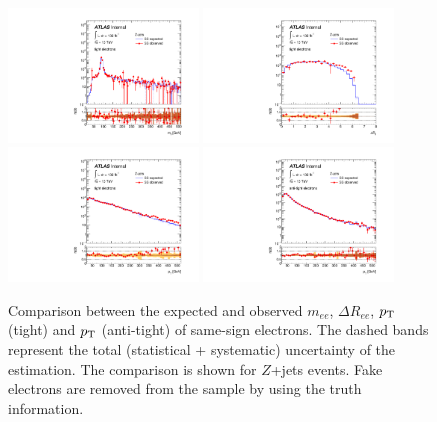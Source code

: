 \begin{figure}[htb!]
\centering
  \includegraphics[width=0.45\textwidth]{figures/qmisid/valid_MlltightZ}
  \includegraphics[width=0.45\textwidth]{figures/qmisid/valid_DRlltightZ}\\
  \includegraphics[width=0.45\textwidth]{figures/qmisid/valid_PttightZ}
  \includegraphics[width=0.45\textwidth]{figures/qmisid/valid_PtatightZ}\\
  \caption{Comparison between the expected and observed $m_{ee}$,
${\Delta}R_{ee}$, $p_{\mathrm{T}}$ (tight) and $p_{\mathrm{T}}$ (anti-tight) of same-sign electrons.
The dashed bands represent the total (statistical + systematic) uncertainty of the estimation.
 The comparison is shown for $Z$+jets events. Fake electrons are removed from
 the sample by using the truth information.\label{fig:clMC}} 
\end{figure}

